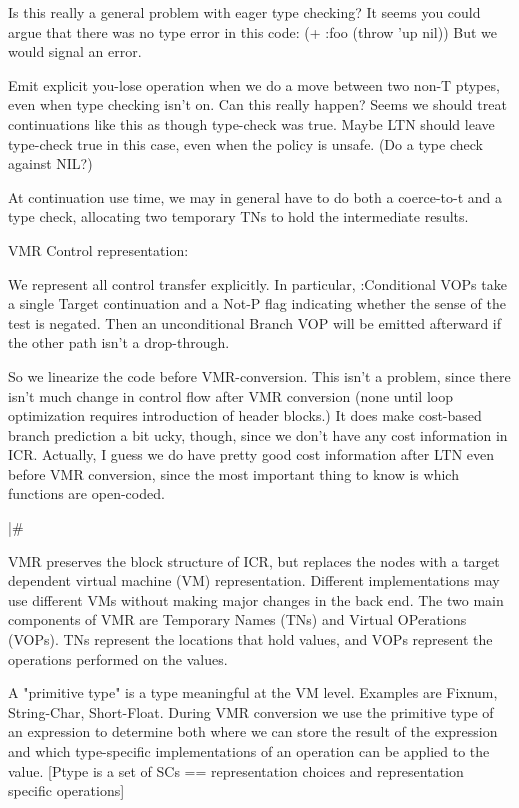 Is this really a general problem with eager type checking?  It seems you could
argue that there was no type error in this code:
    (+ :foo (throw 'up nil))
But we would signal an error.


Emit explicit you-lose operation when we do a move between two non-T ptypes,
even when type checking isn't on.  Can this really happen?  Seems we should
treat continuations like this as though type-check was true.  Maybe LTN should
leave type-check true in this case, even when the policy is unsafe.  (Do a type
check against NIL?)

At continuation use time, we may in general have to do both a coerce-to-t and a
type check, allocating two temporary TNs to hold the intermediate results.


VMR Control representation:

We represent all control transfer explicitly.  In particular, :Conditional VOPs
take a single Target continuation and a Not-P flag indicating whether the sense
of the test is negated.  Then an unconditional Branch VOP will be emitted
afterward if the other path isn't a drop-through.

So we linearize the code before VMR-conversion.  This isn't a problem,
since there isn't much change in control flow after VMR conversion (none until
loop optimization requires introduction of header blocks.)  It does make
cost-based branch prediction a bit ucky, though, since we don't have any cost
information in ICR.  Actually, I guess we do have pretty good cost information
after LTN even before VMR conversion, since the most important thing to know is
which functions are open-coded.

|\#

VMR preserves the block structure of ICR, but replaces the nodes with a target
dependent virtual machine (VM) representation.  Different implementations may
use different VMs without making major changes in the back end.  The two main
components of VMR are Temporary Names (TNs) and Virtual OPerations (VOPs).  TNs
represent the locations that hold values, and VOPs represent the operations
performed on the values.

A "primitive type" is a type meaningful at the VM level.  Examples are Fixnum,
String-Char, Short-Float.  During VMR conversion we use the primitive type of
an expression to determine both where we can store the result of the expression
and which type-specific implementations of an operation can be applied to the
value.  [Ptype is a set of SCs == representation choices and representation
specific operations]

